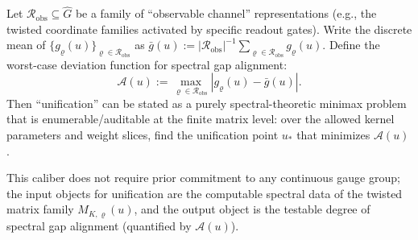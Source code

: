 \begin{remark}\label{rem:spec-gap-minimax-unification}
Let \(\mathcal{R}_{\mathrm{obs}}\subseteq \widehat G\) be a family of ``observable channel'' representations (e.g., the twisted coordinate families activated by specific readout gates).
Write the discrete mean of \(\{g_{\varrho}(u)\}_{\varrho\in\mathcal{R}_{\mathrm{obs}}}\) as
\(
\bar g(u):=|\mathcal{R}_{\mathrm{obs}}|^{-1}\sum_{\varrho\in\mathcal{R}_{\mathrm{obs}}}g_{\varrho}(u)
\).
Define the worst-case deviation function for spectral gap alignment:
\[
\mathcal{A}(u):=\max_{\varrho\in\mathcal{R}_{\mathrm{obs}}}\left|g_{\varrho}(u)-\bar g(u)\right|.
\]
Then ``unification'' can be stated as a purely spectral-theoretic minimax problem that is enumerable/auditable at the finite matrix level:
over the allowed kernel parameters and weight slices, find the unification point \(u_\ast\) that minimizes \(\mathcal{A}(u)\).
\par
This caliber does not require prior commitment to any continuous gauge group; the input objects for unification are the computable spectral data of the twisted matrix family \(M_{K,\varrho}(u)\),
and the output object is the testable degree of spectral gap alignment (quantified by \(\mathcal{A}(u)\)).
\end{remark}



